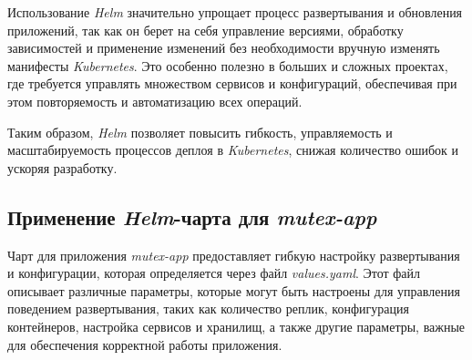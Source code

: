 Использование \textit{Helm} значительно упрощает процесс развертывания и обновления приложений, так как он берет на себя управление версиями, обработку зависимостей и применение изменений без необходимости вручную изменять манифесты \textit{Kubernetes}. Это особенно полезно в больших и сложных проектах, где требуется управлять множеством сервисов и конфигураций, обеспечивая при этом повторяемость и автоматизацию всех операций.

Таким образом, \textit{Helm} позволяет повысить гибкость, управляемость и масштабируемость процессов деплоя в \textit{Kubernetes}, снижая количество ошибок и ускоряя разработку.


\subsection{Применение \textit{Helm}-чарта для \textit{mutex-app}}

Чарт для приложения \textit{mutex-app} предоставляет гибкую настройку развертывания и конфигурации, которая определяется через файл \textit{values.yaml}. Этот файл описывает различные параметры, которые могут быть настроены для управления поведением развертывания, таких как количество реплик, конфигурация контейнеров, настройка сервисов и хранилищ, а также другие параметры, важные для обеспечения корректной работы приложения.

